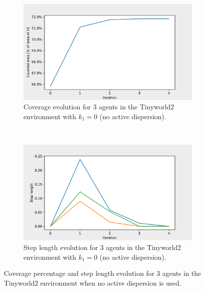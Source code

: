 \begin{figure}[H]
  \centering
  \begin{subfigure}[t]{0.5\textwidth}
    \centering
    \includegraphics[width=\textwidth]{figs/tinyworld2_3_agnt_k_1_0_k_2_1_area_traj.pdf}
    \caption{Coverage evolution for 3 agents in the Tinyworld2 environment with $k_{1} = 0$ (no active dispersion).}
    \label{fig:3_agnt_tw2_k_1_0_a_traj}
  \end{subfigure}%
  ~ 
  \begin{subfigure}[t]{0.5\textwidth}
    \centering
    \includegraphics[width=\textwidth]{figs/tinyworld2_3_agnt_k_1_0_k_2_1_step_traj.pdf}
    \caption{Step length evolution for 3 agents in the Tinyworld2 environment with $k_{1} = 0$ (no active dispersion).}
    \label{fig:3_agnt_tw2_k_1_0_s_traj}
  \end{subfigure}
  \caption{Coverage percentage and step length evolution for 3 agents in the Tinyworld2 environment when no active dispersion is used.}
  \label{fig:3_agnt_tw2_evolution}
\end{figure}


